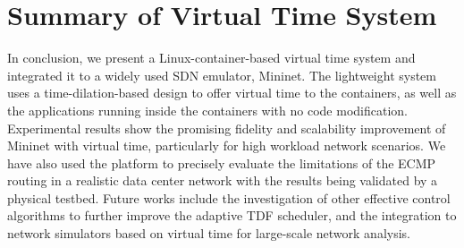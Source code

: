 \section{Summary of Virtual Time System}
\label{VT:Sec:Conclusion}
In conclusion, we present a Linux-container-based virtual time system and integrated it to a widely used SDN emulator, Mininet.
The lightweight system uses a time-dilation-based design to offer virtual time to the containers,
as well as the applications running inside the containers with no code modification.
Experimental results show the promising fidelity and scalability improvement of Mininet with virtual time,
particularly for high workload network scenarios. We have also used the platform to precisely
evaluate the limitations of the ECMP routing in a realistic data center network with the results being validated by a physical testbed.
Future works include the investigation of other effective control algorithms to further improve the adaptive TDF scheduler,
and the integration to network simulators based on virtual time for large-scale network analysis.

